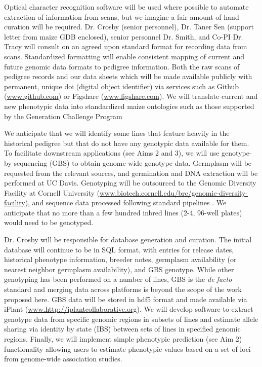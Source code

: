 \documentclass[12pt]{article}
\begin{document}
Optical character recognition software will be used where possible to automate extraction of information from scans, but we imagine a fair amount of hand-curation will be required.
Dr. Crosby (senior personnel), Dr. Taner Sen (support letter from maize GDB enclosed), senior personnel Dr.  Smith, and Co-PI Dr. Tracy will consult on an agreed upon standard format for recording data from scans.
Standardized formatting will enable consistent mapping of current and future genomic data formats to pedigree information. Both the raw scans of pedigree records and our data sheets which will be made available publicly with permanent, unique doi (digital object identifier) via services such as Github (\url{www.github.com}) or Figshare (\url{www.figshare.com}).
We will translate current and new phenotypic data into standardized maize ontologies such as those supported by the Generation Challenge Program \citep[\url{http://www.cropontology.org/ontology/CO_322/Maize}, ][]{shrestha2012bridging}

We anticipate that we will identify some lines that feature heavily in the historical pedigree but that do not have any genotypic data available for them. 
To facilitate downstream applications (see Aims 2 and 3), we will use genotype-by-sequencing (GBS) \citep{Elshire:2011ha} to obtain genome-wide genotype data.
Germplasm will be requested from the relevant sources, and germination and DNA extraction will be performed at UC Davis.  
Genotyping will be outsourced to the Genomic Diversity Facility at Cornell University (\small{\url{www.biotech.cornell.edu/brc/genomic-diversity-facility}}), and sequence data processed following standard pipelines \citep{Glaubitz:2014eu}.
We anticipate that no more than a few hundred inbred lines (2-4, 96-well plates) would need to be genotyped.

Dr. Crosby will be responsible for database generation and curation.
The initial database will continue to be in SQL format, with entries for release dates, historical phenotype information, breeder notes, germplasm availability (or nearest neighbor germplasm availability), and GBS genotype.  
While other genotyping has been performed on a number of lines, GBS is the \emph{de facto} standard \citep{romay2013comprehensive} and merging data across platforms is beyond the scope of the work proposed here. 
GBS data will be stored in hdf5 format and made available via iPlant (\url{www.http://iplantcollaborative.org}).
We will develop software to extract genotype data from specific genomic regions in subsets of lines and estimate allele sharing via identity by state (IBS) between sets of lines in specified genomic regions.
Finally, we will implement simple phenotypic prediction (see Aim 2) functionality allowing users to estimate phenotypic values based on a set of loci from genome-wide association studies.
\end{document}
